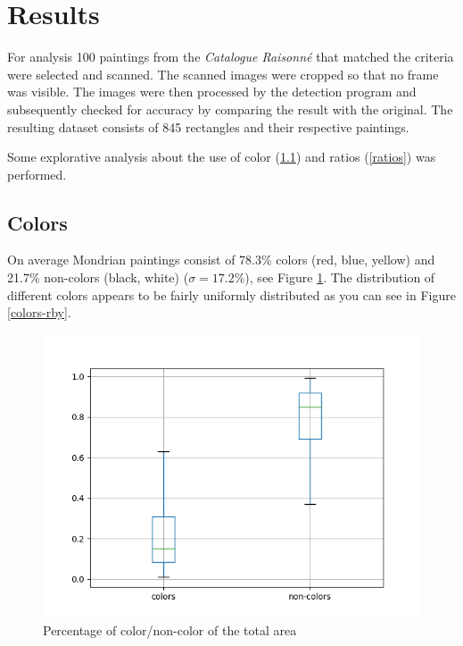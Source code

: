 \section{Results} \label{results}

For analysis 100 paintings from the \textit{Catalogue Raisonn{\'e}}
\cite{joosten1998} that matched the criteria were selected and scanned. The
scanned images were cropped so that no frame was visible. The images were then
processed by the detection program and subsequently checked for accuracy by
comparing the result with the original. The resulting dataset consists of 845
rectangles and their respective paintings.

Some explorative analysis about the use of color (\ref{color}) and ratios
(\ref{ratios}) was performed.

\subsection{Colors} \label{color}

On average Mondrian paintings consist of 78.3\% colors (red, blue, yellow) and
21.7\% non-colors (black, white) ($\sigma = 17.2\%$), see Figure
\ref{fig:colors-noncolors}. The distribution of different colors appears to be
fairly uniformly distributed as you can see in Figure \ref{colors-rby}.

\begin{figure}
\includegraphics[width=\linewidth]{images/colors-non-colors.png}
\caption{Percentage of color/non-color of the total area}
\label{fig:colors-noncolors}
\end{figure}

